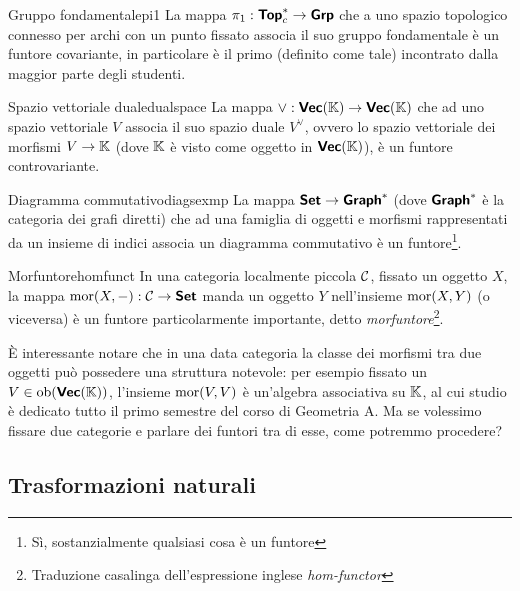 \documentclass{article}
\begin{document}
\begin{example}{Gruppo fondamentale}{pi1}
    La mappa $\pi_1 : \text{\sffamily\textbf{Top}}_c^* \to \text{\sffamily\textbf{Grp}}$ che a uno spazio topologico connesso per archi con un punto fissato associa il suo gruppo fondamentale è un funtore covariante, in particolare è il primo (definito come tale) incontrato dalla maggior parte degli studenti.
\end{example}

\begin{example}{Spazio vettoriale duale}{dualspace}
    La mappa $\vee :\text{\sffamily\textbf{Vec}}(\mathbb{K}) \to \text{\sffamily\textbf{Vec}}(\mathbb{K}) $ che ad uno spazio vettoriale $V$ associa il suo spazio duale $V^\vee$, ovvero lo spazio vettoriale dei morfismi $V \to \mathbb{K}$ (dove $\mathbb{K}$ è visto come oggetto in $\text{\sffamily\textbf{Vec}}(\mathbb{K})$), è un funtore controvariante.
\end{example}

\begin{example}{Diagramma commutativo}{diagsexmp}
    La mappa $\text{\sffamily\textbf{Set}} \to \text{\sffamily\textbf{Graph}}^*$ (dove $\text{\sffamily\textbf{Graph}}^*$ è la categoria dei grafi diretti) che ad una famiglia di oggetti e morfismi rappresentati da un insieme di indici associa un diagramma commutativo è un funtore\footnote{Sì, sostanzialmente qualsiasi cosa è un funtore}.
\end{example}

\begin{example}{Morfuntore}{homfunct}
    In una categoria localmente piccola $\mathcal{C}$, fissato un oggetto $X$, la mappa $\operatorname{mor}(X,-):\mathcal{C}\to\text{\sffamily\textbf{Set}}$ manda un oggetto $Y$ nell'insieme $\operatorname{mor}(X,Y)$ (o viceversa) è un funtore particolarmente importante, detto \textit{morfuntore}\footnote{Traduzione casalinga dell'espressione inglese \textit{hom-functor}}.
\end{example}

È interessante notare che in una data categoria la classe dei morfismi tra due oggetti può possedere una struttura notevole: per esempio fissato un $V \in \operatorname{ob}(\text{\sffamily\textbf{Vec}}(\mathbb{K}))$, l'insieme $\operatorname{mor}(V,V)$ è un'algebra associativa su $\mathbb{K}$, al cui studio è dedicato tutto il primo semestre del corso di Geometria A. Ma se volessimo fissare due categorie e parlare dei funtori tra di esse, come potremmo procedere?

\subsection{Trasformazioni naturali}
\end{document}
